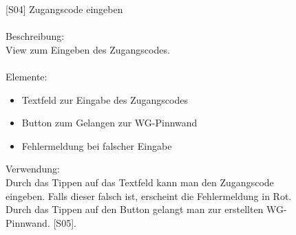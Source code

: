 \documentclass[a4paper]{scrreprt}
\begin{document}
\begin{figure}[h!]
    		\begin{minipage}[t]{0.55\linewidth}
    			\flushleft
    			\vspace{9mm}
    			{[}S04{]} Zugangscode eingeben \\
    			\hfill
    			\\Beschreibung: \\
    			View zum Eingeben des Zugangscodes.\\
    			\hfill
    			\\Elemente:
    			\begin{itemize}
    				\renewcommand\labelitemi{--}
    				\item Textfeld zur Eingabe des Zugangscodes
    				\item Button zum Gelangen zur WG-Pinnwand
    				\item Fehlermeldung bei falscher Eingabe
    			\end{itemize}
    		
    			\hfill
    			
    			Verwendung:\\
    			Durch das Tippen auf das Textfeld kann man
    			den Zugangscode eingeben. Falls dieser falsch 
    			ist, erscheint die Fehlermeldung in Rot.
    			\\
    			Durch das Tippen auf den Button gelangt man
    			zur erstellten WG-Pinnwand. {[}S05{]}. 
    			
    			
    			
    		\end{minipage}
    	\end{figure}
    
    	\clearpage
    	
\end{document}
